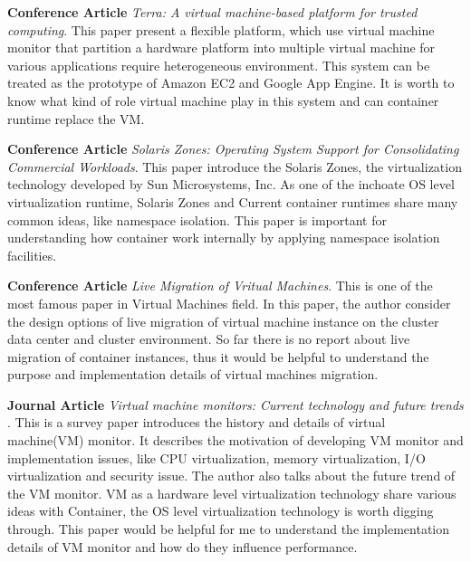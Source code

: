 \documentclass{article}
\begin{document}
\medskip

\textbf{Conference Article} \emph{Terra: A virtual machine-based platform for trusted 
computing}\cite{garfinkel2003terra}. This paper present a flexible platform, which use virtual 
machine monitor that partition a hardware platform into multiple virtual machine for various
applications require heterogeneous environment. This system can be treated as the prototype of
Amazon EC2 and Google App Engine. It is worth to know what kind of role virtual machine play in 
this system and can container runtime replace the VM.

\medskip

\textbf{Conference Article} \emph{Solaris Zones: Operating System Support for Consolidating 
Commercial Workloads}\cite{price2004solaris}. This paper introduce the Solaris Zones, the 
virtualization technology developed by Sun Microsystems, Inc. As one of the inchoate OS 
level virtualization runtime, Solaris Zones and Current container runtimes share many common 
ideas, like namespace isolation. This paper is important for understanding how container 
work internally by applying namespace isolation facilities.

\medskip

\textbf{Conference Article} \emph{Live Migration of Vritual Machines}\cite{clark2005live}. This is
one of the most famous paper in Virtual Machines field. In this paper, the author consider the design 
options of live migration of virtual machine instance on the cluster data center and cluster 
environment. So far there is no report about live migration of container instances, thus it would be 
helpful to understand the purpose and implementation details of virtual machines migration. 

\medskip

\textbf{Journal Article} \emph{Virtual machine monitors: Current technology and future trends}
\cite{rosenblum2005virtual}. This is a survey paper introduces the history and details of virtual 
machine(VM) monitor. It describes the motivation of developing VM monitor and implementation 
issues, like CPU virtualization, memory virtualization, I/O virtualization and security issue. The
author also talks about the future trend of the VM monitor. VM as a hardware level virtualization
technology share various ideas with Container, the OS level virtualization technology is worth 
digging through. This paper would be helpful for me to understand the implementation details of VM 
monitor and how do they influence performance.
\end{document}
